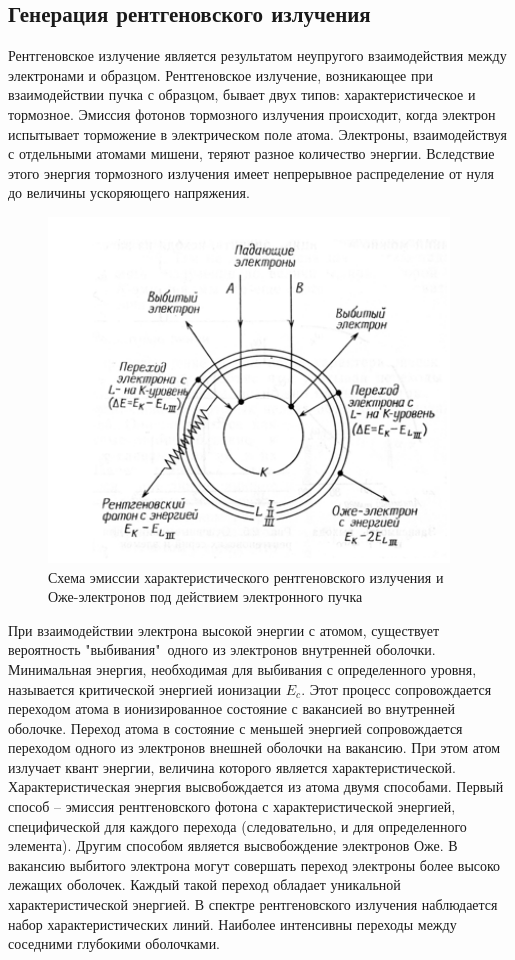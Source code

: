 \documentclass[14pt]{extarticle}
\begin{document}
\subsection*{Генерация рентгеновского излучения}
	Рентгеновское излучение является результатом неупругого взаимодействия между электронами и образцом. Рентгеновское излучение, возникающее при взаимодействии пучка с образцом, бывает двух типов: характеристическое и тормозное. Эмиссия фотонов тормозного излучения происходит, когда электрон испытывает торможение в электрическом поле атома. Электроны, взаимодействуя с отдельными атомами мишени, теряют разное количество энергии. Вследствие этого энергия тормозного излучения имеет непрерывное распределение от нуля до величины ускоряющего напряжения. \par

\begin{figure}[H]
	\centering
	\includegraphics[width = 0.5\linewidth]{./pictures/auger.png}
	\caption{Схема эмиссии характеристического рентгеновского излучения и Оже-электронов под действием электронного пучка}
\end{figure}			
При взаимодействии электрона высокой энергии с атомом, существует вероятность "выбивания"\ одного из электронов внутренней оболочки. Минимальная энергия, необходимая для выбивания с определенного уровня, называется критической энергией ионизации $E_c$. Этот процесс сопровождается переходом атома в ионизированное состояние с вакансией во внутренней оболочке. Переход атома в состояние с меньшей энергией сопровождается переходом одного из электронов внешней оболочки на вакансию. При этом атом излучает квант энергии, величина которого является характеристической. Характеристическая энергия высвобождается из атома двумя способами. Первый способ -- эмиссия рентгеновского фотона с характеристической энергией, специфической для каждого перехода (следовательно, и для определенного элемента). Другим способом является высвобождение электронов Оже. 
В вакансию выбитого электрона могут совершать переход электроны более высоко лежащих оболочек. Каждый такой переход обладает уникальной характеристической энергией. В спектре рентгеновского излучения наблюдается набор характеристических линий. Наиболее интенсивны переходы между соседними глубокими оболочками.
	
\end{document}
